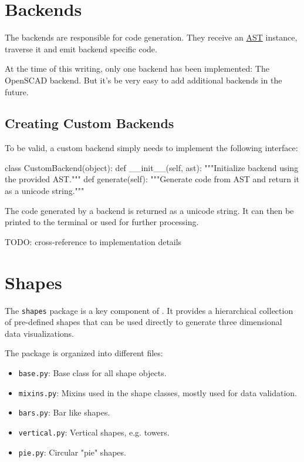 \section{Backends}\label{sec:backends}

The backends are responsible for code generation. They receive an
\hyperref[sec:ast]{AST} instance, traverse it and emit backend specific code.

At the time of this writing, only one backend has been implemented: The OpenSCAD
backend. But it's be very easy to add additional backends in the future.

\subsection{Creating Custom Backends}

To be valid, a custom backend simply needs to implement the following interface:

\vspace{.5\baselineskip}

\begin{pythoncode}
class CustomBackend(object):
    def __init__(self, ast):
        """Initialize backend using the provided AST."""
    def generate(self):
        """Generate code from AST and return it
        as a unicode string."""
\end{pythoncode}

\noindent The code generated by a backend is returned as a unicode string. It
can then be printed to the terminal or used for further processing.


TODO: cross-reference to implementation details


\section{Shapes}\label{sec:shapes}

The \texttt{shapes} package is a key component of \tangible{}. It provides a
hierarchical collection of pre-defined shapes that can be used directly to
generate three dimensional data visualizations.

The package is organized into different files:

\begin{itemize}
	\item \texttt{base.py}: Base class for all shape objects.
	\item \texttt{mixins.py}: Mixins used in the shape classes, mostly used for
		data validation.
	\item \texttt{bars.py}: Bar like shapes.
	\item \texttt{vertical.py}: Vertical shapes, e.g. towers.
	\item \texttt{pie.py}: Circular "pie" shapes.
\end{itemize}

